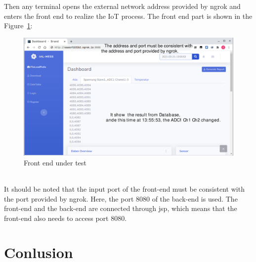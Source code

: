 Then any terminal opens the external network address provided by ngrok and enters the front end to realize the IoT process. The front end part is shown in the Figure~\ref{fig:7.6}:

\begin{figure}[!ht]
	\centering
	\includegraphics[width=16cm]{grafiken/frontend.pdf}
	\caption{Front end under test}
	\label{fig:7.6}
\end{figure}
\FloatBarrier
\\
It should be noted that the input port of the front-end must be consistent with the port provided by ngrok. Here, the port 8080 of the back-end is used. The front-end and the back-end are connected through jsp, which means that the front-end also needs to access port 8080.


 

\chapter{Conlusion}
\label{chap:Conlusion}

